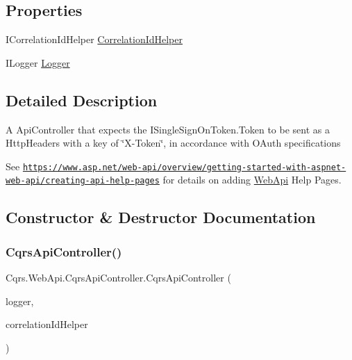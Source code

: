 \subsection*{Properties}
\begin{DoxyCompactItemize}
\item 
I\+Correlation\+Id\+Helper \hyperlink{classCqrs_1_1WebApi_1_1CqrsApiController_a146cfce225b189571b5f13b47e37b595_a146cfce225b189571b5f13b47e37b595}{Correlation\+Id\+Helper}
\item 
I\+Logger \hyperlink{classCqrs_1_1WebApi_1_1CqrsApiController_ae5536cab68a0c000aff82036820956d8_ae5536cab68a0c000aff82036820956d8}{Logger}
\end{DoxyCompactItemize}


\subsection{Detailed Description}
A Api\+Controller that expects the I\+Single\+Sign\+On\+Token.\+Token to be sent as a Http\+Headers with a key of \char`\"{}\+X-\/\+Token\char`\"{}, in accordance with O\+Auth specifications 

See \href{https://www.asp.net/web-api/overview/getting-started-with-aspnet-web-api/creating-api-help-pages}{\tt https\+://www.\+asp.\+net/web-\/api/overview/getting-\/started-\/with-\/aspnet-\/web-\/api/creating-\/api-\/help-\/pages} for details on adding \hyperlink{namespaceCqrs_1_1WebApi}{Web\+Api} Help Pages. 

\subsection{Constructor \& Destructor Documentation}
\mbox{\label{classCqrs_1_1WebApi_1_1CqrsApiController_a83125cca7cbb61ac890d3a4115db2bdf_a83125cca7cbb61ac890d3a4115db2bdf}} 
\subsubsection{\texorpdfstring{Cqrs\+Api\+Controller()}{CqrsApiController()}}
{\footnotesize\ttfamily Cqrs.\+Web\+Api.\+Cqrs\+Api\+Controller.\+Cqrs\+Api\+Controller (\begin{DoxyParamCaption}\item[{I\+Logger}]{logger,  }\item[{I\+Correlation\+Id\+Helper}]{correlation\+Id\+Helper }\end{DoxyParamCaption})\hspace{0.3cm}{\ttfamily [protected]}}



